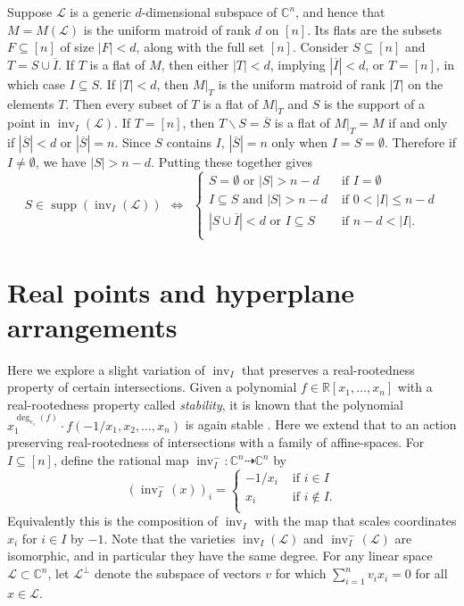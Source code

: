 \documentclass[ALCO,ThmDefs,Unicode,epreuves]{cedram}
\newcommand{\R}{\mathbb{R}}
\newcommand{\Cbb}{\mathbb{C}}
\newcommand{\cL}{\mathcal{L}}
\newcommand{\ol}{\overline}
\DeclareMathOperator{\inv}{inv}
\DeclareMathOperator{\supp}{supp}
\begin{document}
\begin{exam} Suppose $\cL$ is a generic $d$-dimensional subspace of $\Cbb^n$, and hence that $M =M(\cL)$ is the uniform matroid 
of rank $d$ on $[n]$. Its flats are the subsets $F\subseteq [n]$ of size $|F|<d$, along with the full set $[n]$. 
Consider $S\subseteq [n]$ and $T = S \cup \ol{I}$. If $T$ is a flat of $M$, then either $|T|<d$, implying $|\ol{I}|<d$, 
or $T= [n]$, in which case $I\subseteq S$. 
If $|T|<d$, then $M|_T$ is the uniform matroid of rank $|T|$ on the elements $T$. 
Then every subset of $T$ is a flat of $M|_T$ and $S$ is the support of a point in $\inv_I(\cL)$. 
If $T = [n]$, then $T\backslash S = \ol{S}$ is a flat of $M|_T = M$ if and only if 
$|\ol{S}|<d$ or $|\ol{S}|=n$. Since $S$ contains $I$, $|\ol{S}|=n$ only when $I = S=\emptyset$. 
Therefore if $I \neq \emptyset$, we have $|S|>n-d$. Putting these together gives
\[
S\in \supp(\inv_I(\cL)) \ \ \Longleftrightarrow \ \
\begin{cases} 
S =\emptyset \text{ or } |S|>n-d & \text{ if } I = \emptyset\\
I\subseteq S \text{ and } |S|>n-d & \text{ if } 0<|I|\leq n-d\\
 |S\cup \ol{I}| <d \text{ or } I\subseteq S & \text{ if } n-d<|I|.\\
\end{cases}
\]
\end{exam}




\section{Real points and hyperplane arrangements}\label{sec:real}

Here we explore a slight variation of $\inv_I$ that preserves a real-rootedness property of certain intersections. 
Given a polynomial $f\in \R[x_1, \ldots , x_n]$ with a real-rootedness property called \emph{stability}, 
it is known that the polynomial $x_1^{\deg_{e_{1}}(f)}\cdot f(-1/ x_1, x_2, \ldots , x_n)$ is again stable \cite[Lemma~2.4]{wagnerSurvey}. 
Here we extend that to an action preserving real-rootedness of intersections with a family of affine-spaces. 
For $I\subseteq [n]$, define the rational map $\inv_I^-: \Cbb^n \dashrightarrow \Cbb^n $ by 
\[(\inv_I^-(x))_i =
\begin{cases}
-1/x_i &\text{ if } i\in I\\
 x_i &\text{ if } i\not\in I.\\
\end{cases}
\]
Equivalently this is the composition of $\inv_I$ with the map that scales coordinates $x_i$ for $i\in I$ by $-1$. 
Note that the varieties $\inv_I(\cL)$ and $\inv_I^-(\cL)$ are isomorphic, and in particular they have the same degree. 
For any linear space $\cL \subset \Cbb^n$, let $\cL^{\perp}$ denote the subspace of vectors $v$ 
for which $\sum_{i=1}^nv_ix_i=0$ for all $x\in \cL$. 
\end{document}
